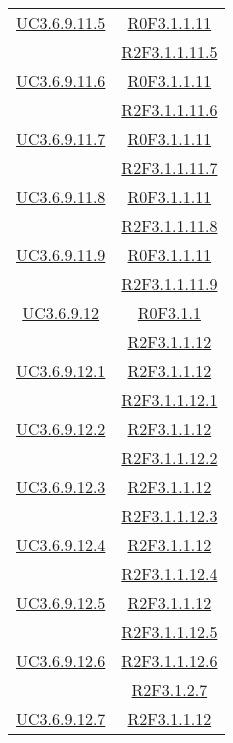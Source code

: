 \begin{longtable}{|c|c|}
\hline
\hyperlink{UC3.6.9.11.5}{UC3.6.9.11.5} & \hyperlink{R0F3.1.1.11}{R0F3.1.1.11}\\
& \hyperlink{R2F3.1.1.11.5}{R2F3.1.1.11.5}\\
\hline
\hyperlink{UC3.6.9.11.6}{UC3.6.9.11.6} & \hyperlink{R0F3.1.1.11}{R0F3.1.1.11}\\
& \hyperlink{R2F3.1.1.11.6}{R2F3.1.1.11.6}\\
\hline
\hyperlink{UC3.6.9.11.7}{UC3.6.9.11.7} & \hyperlink{R0F3.1.1.11}{R0F3.1.1.11}\\
& \hyperlink{R2F3.1.1.11.7}{R2F3.1.1.11.7}\\
\hline
\hyperlink{UC3.6.9.11.8}{UC3.6.9.11.8} & \hyperlink{R0F3.1.1.11}{R0F3.1.1.11}\\
& \hyperlink{R2F3.1.1.11.8}{R2F3.1.1.11.8}\\
\hline
\hyperlink{UC3.6.9.11.9}{UC3.6.9.11.9} & \hyperlink{R0F3.1.1.11}{R0F3.1.1.11}\\
& \hyperlink{R2F3.1.1.11.9}{R2F3.1.1.11.9}\\
\hline
\hyperlink{UC3.6.9.12}{UC3.6.9.12} & \hyperlink{R0F3.1.1}{R0F3.1.1}\\
& \hyperlink{R2F3.1.1.12}{R2F3.1.1.12}\\
\hline
\hyperlink{UC3.6.9.12.1}{UC3.6.9.12.1} & \hyperlink{R2F3.1.1.12}{R2F3.1.1.12}\\
& \hyperlink{R2F3.1.1.12.1}{R2F3.1.1.12.1}\\
\hline
\hyperlink{UC3.6.9.12.2}{UC3.6.9.12.2} & \hyperlink{R2F3.1.1.12}{R2F3.1.1.12}\\
& \hyperlink{R2F3.1.1.12.2}{R2F3.1.1.12.2}\\
\hline
\hyperlink{UC3.6.9.12.3}{UC3.6.9.12.3} & \hyperlink{R2F3.1.1.12}{R2F3.1.1.12}\\
& \hyperlink{R2F3.1.1.12.3}{R2F3.1.1.12.3}\\
\hline
\hyperlink{UC3.6.9.12.4}{UC3.6.9.12.4} & \hyperlink{R2F3.1.1.12}{R2F3.1.1.12}\\
& \hyperlink{R2F3.1.1.12.4}{R2F3.1.1.12.4}\\
\hline
\hyperlink{UC3.6.9.12.5}{UC3.6.9.12.5} & \hyperlink{R2F3.1.1.12}{R2F3.1.1.12}\\
& \hyperlink{R2F3.1.1.12.5}{R2F3.1.1.12.5}\\
\hline
\hyperlink{UC3.6.9.12.6}{UC3.6.9.12.6} & \hyperlink{R2F3.1.1.12.6}{R2F3.1.1.12.6}\\
& \hyperlink{R2F3.1.2.7}{R2F3.1.2.7}\\
\hline
\hyperlink{UC3.6.9.12.7}{UC3.6.9.12.7} & \hyperlink{R2F3.1.1.12}{R2F3.1.1.12}\\

\end{longtable}
